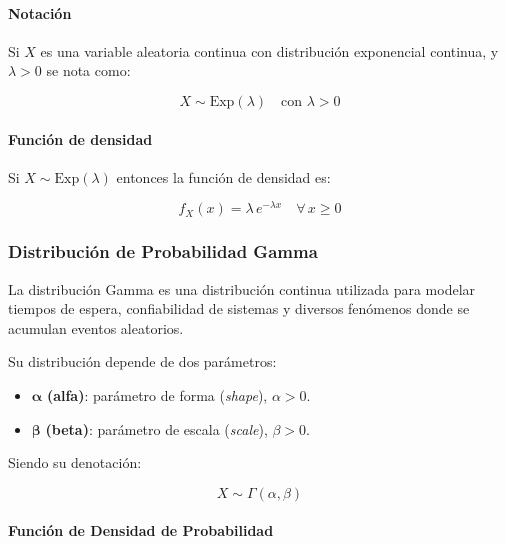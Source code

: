 \documentclass{article}
\begin{document}
\paragraph{Notación}

Si $X$ es una variable aleatoria continua con distribución exponencial continua, y $\lambda > 0$
se nota como:

\begin{equation}
    X \sim \mathrm{Exp}(\lambda) \quad \text{con } \lambda > 0
\end{equation}

\paragraph{Función de densidad}

Si $X \sim \mathrm{Exp}(\lambda)$ entonces la función de densidad es:

\begin{equation}
    f_X(x) = \lambda\, e^{-\lambda x} \quad \forall\, x \geq 0
\end{equation}


\subsubsection{Distribución de Probabilidad Gamma}

La distribución Gamma es una distribución continua utilizada para modelar tiempos de
espera, confiabilidad de sistemas y diversos fenómenos donde se acumulan eventos
aleatorios.

Su distribución depende de dos parámetros:

\begin{itemize}
    \item $\boldsymbol{\alpha}$ \textbf{(alfa)}: parámetro de forma (\textit{shape}), $\alpha > 0$.
    \item $\boldsymbol{\beta}$ \textbf{(beta)}: parámetro de escala (\textit{scale}), $\beta > 0$.
\end{itemize}

Siendo su denotación:

\begin{equation}
    X \sim \Gamma(\alpha, \beta)
\end{equation}

\paragraph{Función de Densidad de Probabilidad}
\end{document}
